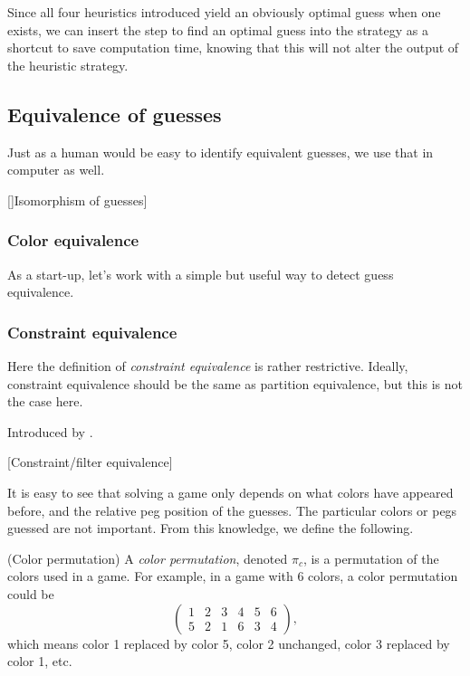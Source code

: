 Since all four heuristics introduced yield an obviously optimal guess when one exists, we can insert the step to find an optimal guess into the strategy as a shortcut to save computation time, knowing that this will not alter the output of the heuristic strategy.

\subsection{Equivalence of guesses}

Just as a human would be easy to identify equivalent guesses, we use that in computer as well.

[]Isomorphism of guesses]

\subsubsection{Color equivalence}

As a start-up, let's work with a simple but useful way to detect guess equivalence.

\subsubsection{Constraint equivalence}

Here the definition of \emph{constraint equivalence} is rather restrictive. Ideally, constraint equivalence should be the same as partition equivalence, but this is not the case here.

Introduced by \cite{neuwirth81,koyama93}. 

[Constraint/filter equivalence]

It is easy to see that solving a game only depends on what colors have appeared before, and the relative peg position of the guesses. The particular colors or pegs guessed are not important. From this knowledge, we define the following.

\begin{definition}
(Color permutation) A \emph{color permutation}, denoted $\pi_c$, is a permutation of the colors used in a game. For example, in a game with 6 colors, a color permutation could be
\[
\begin{pmatrix}
1 & 2 & 3 & 4 & 5 & 6 \\
5 & 2 & 1 & 6 & 3 & 4
\end{pmatrix} ,
\]
which means color 1 replaced by color 5, color 2 unchanged, color 3 replaced by color 1, etc.
\end{definition}

